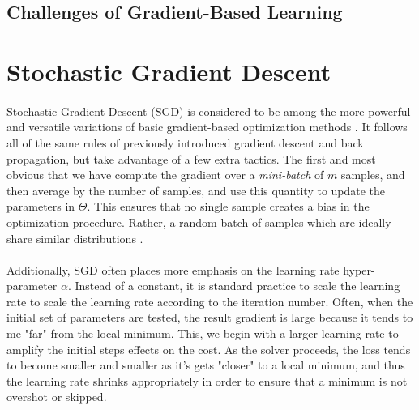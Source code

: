 \documentclass[12pt,letterpaper]{article}
\begin{document}
\subsection{Challenges of Gradient-Based Learning}




\section{Stochastic Gradient Descent}

\paragraph*{}Stochastic Gradient Descent (SGD) is considered to be among the more powerful and versatile variations of basic gradient-based optimization methods \cite{Geron}. It follows all of the same rules of previously introduced gradient descent and back propagation, but take advantage of a few extra tactics. The first and most obvious that we have compute the gradient over a \textit{mini-batch} of $m$ samples, and then average by the number of samples, and use this quantity to update the parameters in $\Theta$. This ensures that no single sample creates a bias in the optimization procedure. Rather, a random batch of samples which are ideally share similar distributions \cite{James}.

\paragraph*{}Additionally, SGD often places more emphasis on the learning rate hyper-parameter $\alpha$. Instead of a constant, it is standard practice to  scale the learning rate to scale the learning rate according to the iteration number. Often, when the initial set of parameters are tested, the result gradient is large because it tends to me "far" from the local minimum. This, we begin with a larger learning rate to amplify the initial steps effects on the cost. As the solver proceeds, the loss tends to become smaller and smaller as it's gets "closer" to a local minimum, and thus the learning rate shrinks appropriately in order to ensure that a minimum is not overshot or skipped.
\end{document}
